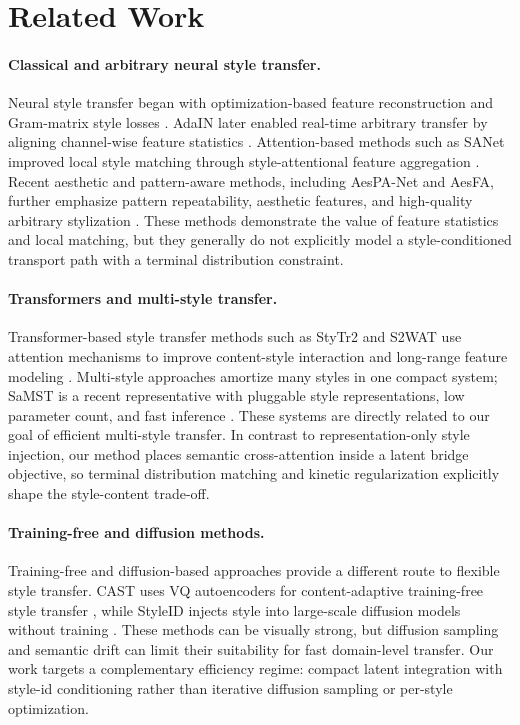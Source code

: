 ﻿\documentclass[letterpaper]{article}
\begin{document}
\section{Related Work}
\paragraph{Classical and arbitrary neural style transfer.}
Neural style transfer began with optimization-based feature reconstruction and Gram-matrix style losses \cite{gatys2016image}. AdaIN later enabled real-time arbitrary transfer by aligning channel-wise feature statistics \cite{huang2017adain}. Attention-based methods such as SANet improved local style matching through style-attentional feature aggregation \cite{park2019sanet}. Recent aesthetic and pattern-aware methods, including AesPA-Net and AesFA, further emphasize pattern repeatability, aesthetic features, and high-quality arbitrary stylization \cite{hong2023aespa,huang2024aesfa}. These methods demonstrate the value of feature statistics and local matching, but they generally do not explicitly model a style-conditioned transport path with a terminal distribution constraint.

\paragraph{Transformers and multi-style transfer.}
Transformer-based style transfer methods such as StyTr2 and S2WAT use attention mechanisms to improve content-style interaction and long-range feature modeling \cite{deng2022stytr2,xia2024s2wat}. Multi-style approaches amortize many styles in one compact system; SaMST is a recent representative with pluggable style representations, low parameter count, and fast inference \cite{liu2024samst}. These systems are directly related to our goal of efficient multi-style transfer. In contrast to representation-only style injection, our method places semantic cross-attention inside a latent bridge objective, so terminal distribution matching and kinetic regularization explicitly shape the style-content trade-off.

\paragraph{Training-free and diffusion methods.}
Training-free and diffusion-based approaches provide a different route to flexible style transfer. CAST uses VQ autoencoders for content-adaptive training-free style transfer \cite{gim2024cast}, while StyleID injects style into large-scale diffusion models without training \cite{chung2024styleid}. These methods can be visually strong, but diffusion sampling and semantic drift can limit their suitability for fast domain-level transfer. Our work targets a complementary efficiency regime: compact latent integration with style-id conditioning rather than iterative diffusion sampling or per-style optimization.
\end{document}
